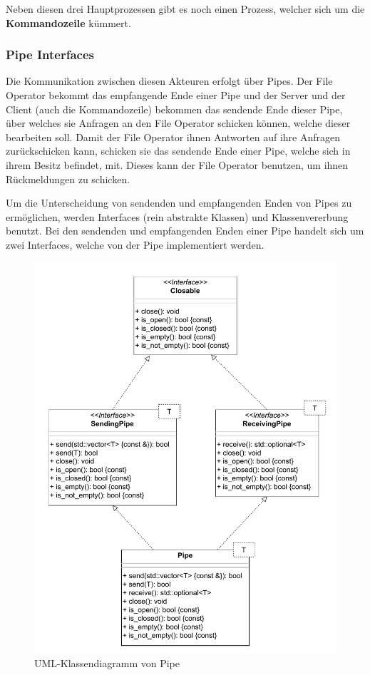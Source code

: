 Neben diesen drei Hauptprozessen gibt es noch einen Prozess, welcher sich um die \textbf{Kommandozeile} kümmert. 

\subsubsection{Pipe Interfaces}
\label{sec:pipe}

Die Kommunikation zwischen diesen Akteuren erfolgt über Pipes. Der File Operator bekommt das empfangende Ende einer Pipe und der Server und der Client 
(auch die Kommandozeile) bekommen das sendende Ende dieser Pipe, über welches sie Anfragen an den File Operator schicken können, welche dieser bearbeiten 
soll. Damit der File Operator ihnen Antworten auf ihre Anfragen zurückschicken kann, schicken sie das sendende Ende einer Pipe, welche sich in ihrem Besitz 
befindet, mit. Dieses kann der File Operator benutzen, um ihnen Rückmeldungen zu schicken.

Um die Unterscheidung von sendenden und empfangenden Enden von Pipes zu ermöglichen, werden Interfaces (rein abstrakte Klassen) und Klassenvererbung 
benutzt. Bei den sendenden und empfangenden Enden einer Pipe handelt sich um zwei Interfaces, welche von der Pipe implementiert werden.

\begin{figure}
    \centering
    \includegraphics[width=\textwidth]{images/pipe_uml.pdf}
    \caption{UML-Klassendiagramm von Pipe}
    \label{fig:uml}
\end{figure}

